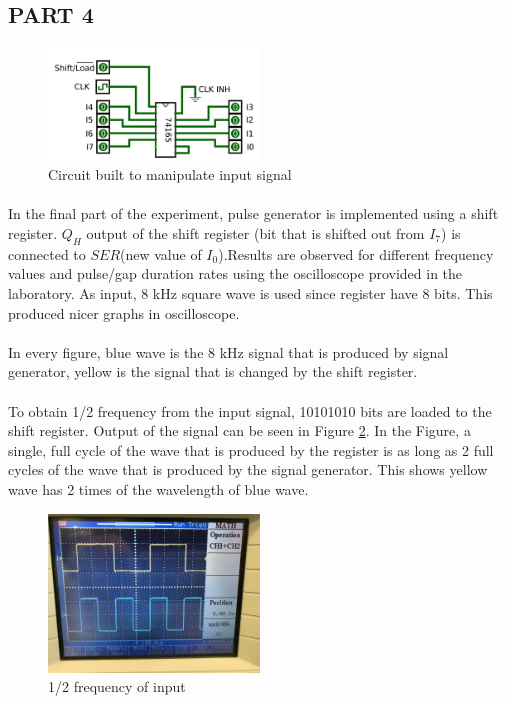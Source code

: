 \documentclass[pdftex,12pt,a4paper]{article}
\begin{document}
\newpage
\begin{flushleft}
\subsection{PART 4}

\begin{figure}[h]
	\centering
	\includegraphics[width=0.5\textwidth]{part4.png}	
	\caption{Circuit built to manipulate input signal}
	\label{fig:part4}
\end{figure}

\paragraph{}
In the final part of the experiment, pulse generator is implemented using a shift register. $Q_{H}$ output of the shift register (bit that is shifted out from $I_{7}$) is connected to $SER$(new value of $I_{0}$).Results are observed for different frequency values and pulse/gap duration rates using the oscilloscope provided in the laboratory. As input, 8 kHz square wave is used since register have 8 bits. This produced nicer graphs in oscilloscope. 

\paragraph{}
In every figure, blue wave is the 8 kHz signal that is produced by signal generator, yellow is the signal that is changed by the shift register.
\paragraph{}
To obtain 1/2 frequency from the input signal, 10101010 bits are loaded to the shift register. Output of the signal can be seen in Figure \ref{fig:1over2}. In the Figure, a single, full cycle of the wave that is produced by the register is as long as 2 full cycles of the wave that is produced by the signal generator. This shows yellow wave has 2 times of the wavelength of blue wave.   
\begin{figure}[h]
	\centering
	\includegraphics[width=0.5\textwidth]{1over2.jpg}	
	\caption{1/2 frequency of input}
	\label{fig:1over2}
\end{figure}


\end{flushleft}
\end{document}
